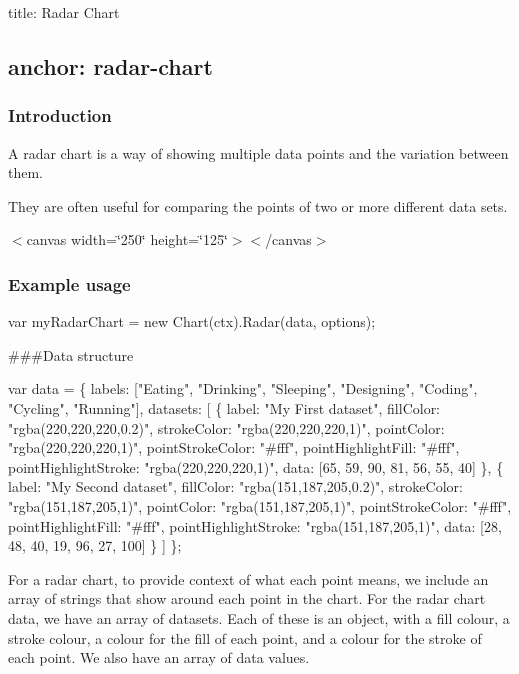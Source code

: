 

 title\+: Radar Chart \subsection*{anchor\+: radar-\/chart }

\subsubsection*{Introduction}

A radar chart is a way of showing multiple data points and the variation between them.

They are often useful for comparing the points of two or more different data sets.

 $<$canvas width=\char`\"{}250\char`\"{} height=\char`\"{}125\char`\"{}$>$$<$/canvas$>$ 

\subsubsection*{Example usage}


\begin{DoxyCode}
var myRadarChart = new Chart(ctx).Radar(data, options);
\end{DoxyCode}


\#\#\#\+Data structure 
\begin{DoxyCode}
var data = \{
    labels: ["Eating", "Drinking", "Sleeping", "Designing", "Coding", "Cycling", "Running"],
    datasets: [
        \{
            label: "My First dataset",
            fillColor: "rgba(220,220,220,0.2)",
            strokeColor: "rgba(220,220,220,1)",
            pointColor: "rgba(220,220,220,1)",
            pointStrokeColor: "#fff",
            pointHighlightFill: "#fff",
            pointHighlightStroke: "rgba(220,220,220,1)",
            data: [65, 59, 90, 81, 56, 55, 40]
        \},
        \{
            label: "My Second dataset",
            fillColor: "rgba(151,187,205,0.2)",
            strokeColor: "rgba(151,187,205,1)",
            pointColor: "rgba(151,187,205,1)",
            pointStrokeColor: "#fff",
            pointHighlightFill: "#fff",
            pointHighlightStroke: "rgba(151,187,205,1)",
            data: [28, 48, 40, 19, 96, 27, 100]
        \}
    ]
\};
\end{DoxyCode}
 For a radar chart, to provide context of what each point means, we include an array of strings that show around each point in the chart. For the radar chart data, we have an array of datasets. Each of these is an object, with a fill colour, a stroke colour, a colour for the fill of each point, and a colour for the stroke of each point. We also have an array of data values.

